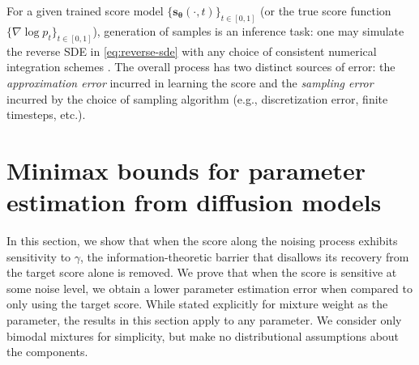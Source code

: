 \documentclass[11pt]{article}
\newcommand{\vect}[1]{\mathbf{#1}}
\theoremstyle{plain}
\newcommand{\1}{\mathbbm{1}}
\newcommand{\btheta}{{\boldsymbol{\theta}}}
\newcommand{\vs}{\vect{s}}
\begin{document}
For a given trained score model $\{\vs_{\btheta }(\cdot, t)\}_{t\in [0,1]}$ (or the true score function $\{\nabla \log p_t\}_{t\in [0,1]}$), generation of samples is an inference task: one may simulate the reverse SDE in \eqref{eq:reverse-sde} with any choice of consistent numerical integration schemes \citep{karras2022elucidating}.
The overall process has 
two distinct sources of error: the \emph{approximation error} incurred in learning the score
and the \emph{sampling error} incurred by the choice of sampling algorithm (e.g., discretization error, finite timesteps, etc.). 

 


\section{Minimax bounds for parameter estimation from diffusion models}\label{sec: parameterized mixture families}
In this section, we show that when the score along the noising process exhibits sensitivity to $\gamma$, the information-theoretic barrier that disallows its recovery from the target score alone is removed. We prove that when the score is sensitive at some noise level, we obtain a lower parameter estimation error when compared to only using the target score. 
While stated explicitly for mixture weight as the parameter, the results in this section apply to any parameter. We consider only bimodal mixtures for simplicity, but make no distributional assumptions about the components. 
\end{document}
